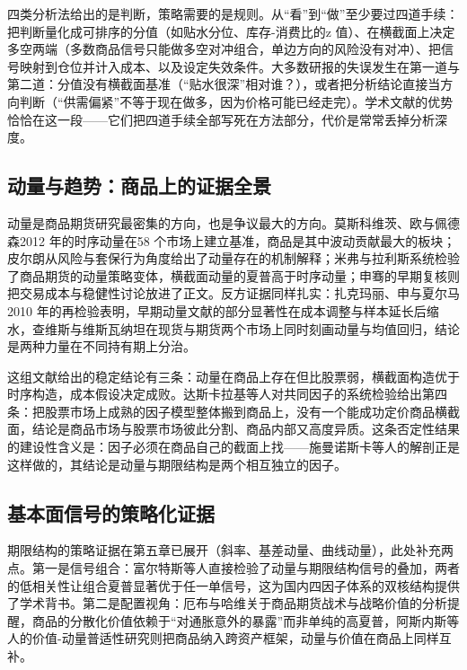 \documentclass[12pt,a4paper]{ctexart}
\begin{document}
四类分析法给出的是判断，策略需要的是规则。从“看”到“做”至少要过四道手续：把判断量化成可排序的分值（如贴水分位、库存-消费比的z 值）、在横截面上决定多空两端（多数商品信号只能做多空对冲组合，单边方向的风险没有对冲）、把信号映射到仓位并计入成本、以及设定失效条件。大多数研报的失误发生在第一道与第二道：分值没有横截面基准（“贴水很深”相对谁？），或者把分析结论直接当方向判断（“供需偏紧”不等于现在做多，因为价格可能已经走完）。学术文献的优势恰恰在这一段——它们把四道手续全部写死在方法部分，代价是常常丢掉分析深度。

\subsection{动量与趋势：商品上的证据全景}

动量是商品期货研究最密集的方向，也是争议最大的方向。莫斯科维茨、欧与佩德森2012 年的时序动量在58 个市场上建立基准，商品是其中波动贡献最大的板块\cite{22}；皮尔朗从风险与套保行为角度给出了动量存在的机制解释\cite{26}；米弗与拉利斯系统检验了商品期货的动量策略变体，横截面动量的夏普高于时序动量\cite{23}；申骞的早期复核则把交易成本与稳健性讨论放进了正文\cite{24}。反方证据同样扎实：扎克玛丽、申与夏尔马2010 年的再检验表明，早期动量文献的部分显著性在成本调整与样本延长后缩水\cite{25}，查维斯与维斯瓦纳坦在现货与期货两个市场上同时刻画动量与均值回归，结论是两种力量在不同持有期上分治\cite{27}。

这组文献给出的稳定结论有三条：动量在商品上存在但比股票弱，横截面构造优于时序构造，成本假设决定成败。达斯卡拉基等人对共同因子的系统检验给出第四条：把股票市场上成熟的因子模型整体搬到商品上，没有一个能成功定价商品横截面，结论是商品市场与股票市场彼此分割、商品内部又高度异质\cite{32}。这条否定性结果的建设性含义是：因子必须在商品自己的截面上找——施曼诺斯卡等人的解剖正是这样做的，其结论是动量与期限结构是两个相互独立的因子\cite{28}。

\subsection{基本面信号的策略化证据}

期限结构的策略证据在第五章已展开（斜率、基差动量、曲线动量\cite{35, 36, 33, 34, 90}），此处补充两点。第一是信号组合：富尔特斯等人直接检验了动量与期限结构信号的叠加，两者的低相关性让组合夏普显著优于任一单信号\cite{31}，这为国内四因子体系的双核结构提供了学术背书\cite{59, 60}。第二是配置视角：厄布与哈维关于商品期货战术与战略价值的分析提醒，商品的分散化价值依赖于“对通胀意外的暴露”而非单纯的高夏普\cite{29}，阿斯内斯等人的价值-动量普适性研究则把商品纳入跨资产框架，动量与价值在商品上同样互补\cite{30}。
\end{document}
